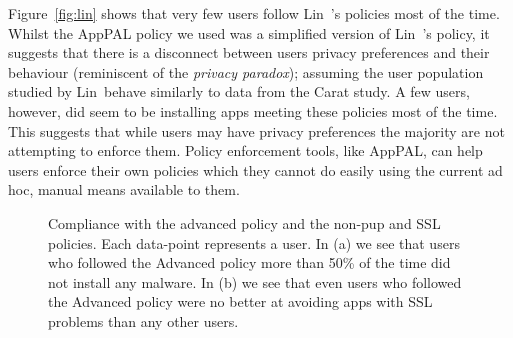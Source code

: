 \documentclass[]{llncs}
\begin{document}
Figure~\ref{fig:lin} shows that very few users follow Lin~\etal's policies most of the time.
Whilst the AppPAL policy we used was a simplified version of Lin~\etal's policy, it suggests that there is a disconnect between users privacy preferences and their behaviour (reminiscent of the \emph{privacy paradox}); assuming the user population studied by Lin~\etal behave similarly to data from the Carat study.
A few users, however, did seem to be installing apps meeting these policies most of the time.
This suggests that while users may have privacy preferences the majority are not attempting to enforce them.
Policy enforcement tools, like AppPAL, can help users enforce their own policies which they cannot do easily using the current ad hoc, manual  means available to them.

\begin{figure}\centering
    \caption{Compliance with the advanced policy and the non-\ac{pup} and SSL policies.  Each data-point represents a user.  In (a) we see that users who followed the Advanced policy more than 50\% of the time did not install any malware.  In (b) we see that even users who followed the Advanced policy were no better at avoiding apps with SSL problems than any other users.}
  \label{fig:versus}
\end{figure}
\end{document}
